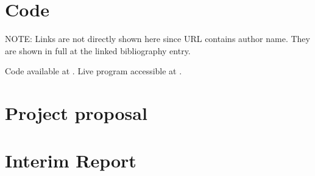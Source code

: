 \section{Code}
NOTE: Links are not directly shown here since URL contains author name. They are shown in full at the linked bibliography entry.

Code available at \cite{webmga_3_github}. Live program accessible at \cite{webmga_3_app}.
\section{Project proposal}

\section{Interim Report}

